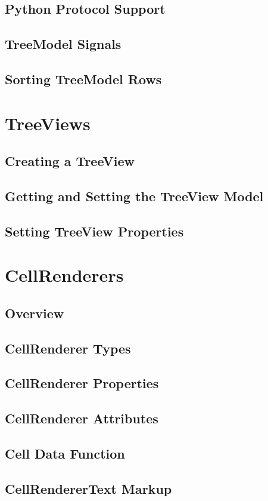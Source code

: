 	\subsection{Python Protocol Support}
	\subsection{TreeModel Signals}
	\subsection{Sorting TreeModel Rows}
\section{TreeViews}
	\subsection{Creating a TreeView}
	\subsection{Getting and Setting the TreeView Model}
	\subsection{Setting TreeView Properties}
\section{CellRenderers}
	\subsection{Overview}
	\subsection{CellRenderer Types}
	\subsection{CellRenderer Properties}
	\subsection{CellRenderer Attributes}
	\subsection{Cell Data Function}
	\subsection{CellRendererText Markup}
